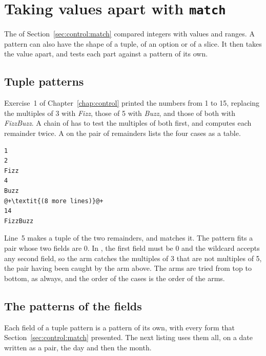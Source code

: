 \vfill\pagebreak
\section{Taking values apart with \texttt{match}}
\label{sec:collections:match}

The  of Section~\ref{sec:control:match} compared integers with
values and ranges. A pattern can also have the shape of a tuple, of an option or
of a slice. It then takes the value apart, and tests each part against a pattern
of its own.

\subsection{Tuple patterns}

Exercise~1 of Chapter~\ref{chap:control} printed the numbers from 1 to 15,
replacing the multiples of 3 with \textit{Fizz}, those of 5 with \textit{Buzz},
and those of both with \textit{FizzBuzz}. A chain of  has to test
the multiples of both first, and computes each remainder twice. A
 on the pair of remainders lists the four cases as a table.


\vspace{-10pt}%
\begin{lstlisting}[style=bashVerb, escapechar=@+]
1
2
Fizz
4
Buzz
@+\textit{(8 more lines)}@+
14
FizzBuzz
\end{lstlisting}

Line~5 makes a tuple of the two remainders, and matches it. The pattern
 fits a pair whose two fields are 0. In , the
first field must be 0 and the wildcard accepts any second field, so the arm
catches the multiples of 3 that are not multiples of 5, the pair 
having been caught by the arm above. The arms are tried from top to bottom, as
always, and the order of the cases is the order of the arms.

\subsection{The patterns of the fields}

Each field of a tuple pattern is a pattern of its own, with every form that
Section~\ref{sec:control:match} presented. The next listing uses them all, on a
date written as a pair, the day and then the month.


